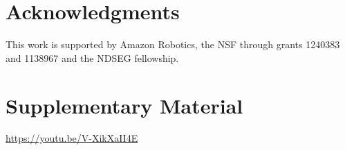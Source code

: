 \documentclass[letterpaper, 10 pt, conference]{ieeeconf}
\begin{document}












\section*{Acknowledgments}
This work is supported by Amazon Robotics, the NSF through grants 1240383 and 1138967 and the NDSEG fellowship.

\section*{Supplementary Material}
\url{https://youtu.be/V-XikXaII4E}



%


\end{document}
